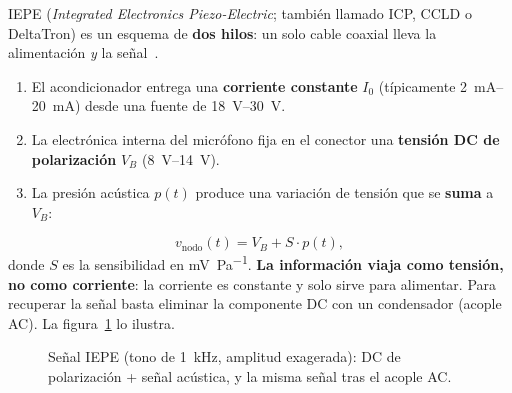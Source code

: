 \documentclass[11pt,a4paper]{article}
\begin{document}
IEPE (\emph{Integrated Electronics Piezo-Electric}; también llamado ICP, CCLD o DeltaTron) es un esquema de \textbf{dos hilos}:
un solo cable coaxial lleva la alimentación \emph{y} la señal~\cite{pcbguide,hbk}.

\begin{enumerate}
  \item El acondicionador entrega una \textbf{corriente constante} $I_0$ (típicamente \SIrange{2}{20}{\milli\ampere}) desde
        una fuente de \SIrange{18}{30}{\volt}.
  \item La electrónica interna del micrófono fija en el conector una \textbf{tensión DC de polarización} $V_B$ (\SIrange{8}{14}{\volt}).
  \item La presión acústica $p(t)$ produce una variación de tensión que se \textbf{suma} a $V_B$:
\end{enumerate}
\begin{equation}
  v_{\text{nodo}}(t) = V_B + S\cdot p(t),
  \label{eq:iepe}
\end{equation}
donde $S$ es la sensibilidad en \si{\milli\volt\per\pascal}. \textbf{La información viaja como tensión, no como corriente}:
la corriente es constante y solo sirve para alimentar. Para recuperar la señal basta eliminar la componente DC con un
condensador (acople AC). La figura~\ref{fig:senal} lo ilustra.

\begin{figure}[H]
\centering
{}
\caption{Señal IEPE (tono de \SI{1}{\kilo\hertz}, amplitud exagerada): DC de polarización + señal acústica, y la misma señal tras el acople AC.}
\label{fig:senal}
\end{figure}
\end{document}

